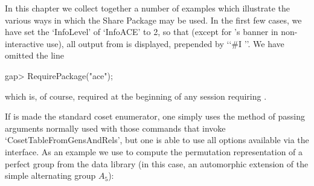 
In this chapter  we  collect  together  a  number  of  examples  which
illustrate the various ways in which the {\ACE} Share Package  may  be
used. In the first few cases, we have set the `InfoLevel' of `InfoACE'
to 2, so that (except for {\ACE}'s banner in non-interactive use), all
output from {\ACE} is displayed, prepended by \lq{}`\#I  ''.  We  have
omitted the line

\begintt
gap> RequirePackage("ace");
\endtt

which is,  of  course,  required  at  the  beginning  of  any  session
requiring {\ACE}.


If {\ACE} is made the standard coset enumerator, one simply  uses  the
method of passing arguments normally used  with  those  commands  that
invoke `CosetTableFromGensAndRels', but one is able to use all options
available via the {\ACE} interface. As an example  we  use  {\ACE}  to
compute the permutation representation of a  perfect  group  from  the
data library (in this case, an automorphic  extension  of  the  simple
alternating group $A_5$):

